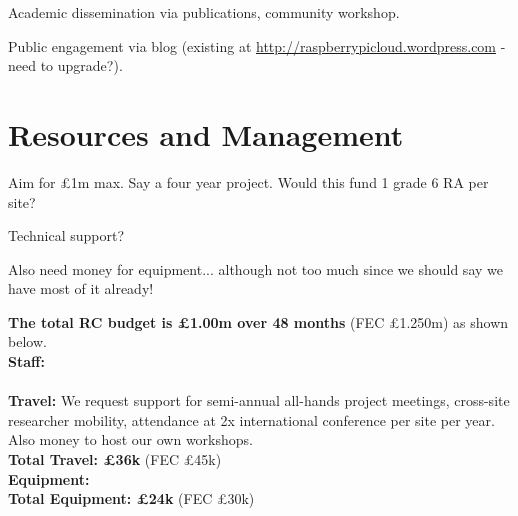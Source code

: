 \documentclass[a4paper,11pt]{article}
\begin{document}

Academic dissemination via publications, community workshop.

Public engagement via blog (existing at \url{http://raspberrypicloud.wordpress.com} - need to upgrade?).


\section{Resources and Management}


Aim for \pounds 1m max.
Say a four year project. Would this fund 1 grade 6 RA per site?

Technical support?

Also need money for equipment... although not too much since we should say we have most of it already!




\textbf{The total RC budget is \pounds 1.00m over 48 months} (FEC \pounds 1.250m) as shown below.
\\
\textbf{Staff:} 
\\
\\
\textbf{Travel:}
We request support for semi-annual all-hands project meetings,
cross-site researcher mobility,
attendance at 2x international conference per site per year.
Also money to host our own workshops.
\\
\textbf{Total Travel: \pounds 36k} (FEC \pounds 45k)\vspace{1mm}
\\
\textbf{Equipment:}
\\
\textbf{Total Equipment: \pounds 24k} (FEC \pounds 30k)
\\



{\small


}
\end{document}
